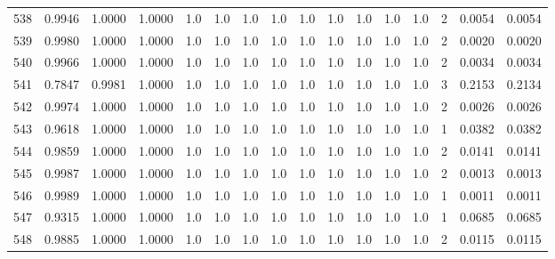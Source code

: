 \begin{tabular}{lrrrrrrrrrrrrrrr}
538 &      0.9946 &  1.0000 &  1.0000 &     1.0 &     1.0 &     1.0 &     1.0 &     1.0 &     1.0 &     1.0 &      1.0 &        1.0 &      2 &                    0.0054 &                     0.0054 \\
539 &      0.9980 &  1.0000 &  1.0000 &     1.0 &     1.0 &     1.0 &     1.0 &     1.0 &     1.0 &     1.0 &      1.0 &        1.0 &      2 &                    0.0020 &                     0.0020 \\
540 &      0.9966 &  1.0000 &  1.0000 &     1.0 &     1.0 &     1.0 &     1.0 &     1.0 &     1.0 &     1.0 &      1.0 &        1.0 &      2 &                    0.0034 &                     0.0034 \\
541 &      0.7847 &  0.9981 &  1.0000 &     1.0 &     1.0 &     1.0 &     1.0 &     1.0 &     1.0 &     1.0 &      1.0 &        1.0 &      3 &                    0.2153 &                     0.2134 \\
542 &      0.9974 &  1.0000 &  1.0000 &     1.0 &     1.0 &     1.0 &     1.0 &     1.0 &     1.0 &     1.0 &      1.0 &        1.0 &      2 &                    0.0026 &                     0.0026 \\
543 &      0.9618 &  1.0000 &  1.0000 &     1.0 &     1.0 &     1.0 &     1.0 &     1.0 &     1.0 &     1.0 &      1.0 &        1.0 &      1 &                    0.0382 &                     0.0382 \\
544 &      0.9859 &  1.0000 &  1.0000 &     1.0 &     1.0 &     1.0 &     1.0 &     1.0 &     1.0 &     1.0 &      1.0 &        1.0 &      2 &                    0.0141 &                     0.0141 \\
545 &      0.9987 &  1.0000 &  1.0000 &     1.0 &     1.0 &     1.0 &     1.0 &     1.0 &     1.0 &     1.0 &      1.0 &        1.0 &      2 &                    0.0013 &                     0.0013 \\
546 &      0.9989 &  1.0000 &  1.0000 &     1.0 &     1.0 &     1.0 &     1.0 &     1.0 &     1.0 &     1.0 &      1.0 &        1.0 &      1 &                    0.0011 &                     0.0011 \\
547 &      0.9315 &  1.0000 &  1.0000 &     1.0 &     1.0 &     1.0 &     1.0 &     1.0 &     1.0 &     1.0 &      1.0 &        1.0 &      1 &                    0.0685 &                     0.0685 \\
548 &      0.9885 &  1.0000 &  1.0000 &     1.0 &     1.0 &     1.0 &     1.0 &     1.0 &     1.0 &     1.0 &      1.0 &        1.0 &      2 &                    0.0115 &                     0.0115 \\

\end{tabular}

